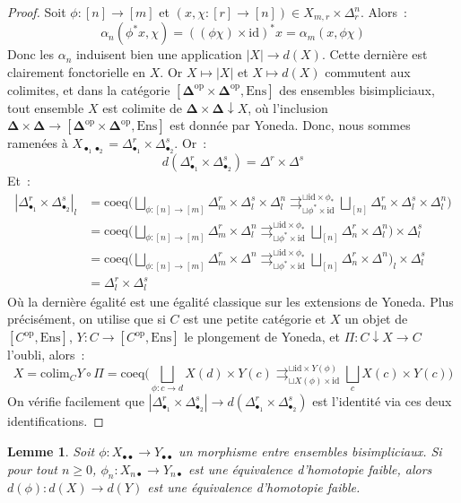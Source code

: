 \documentclass{amsart}
\theoremstyle{plain}
\newtheorem{lem}[theo]{Lemme}
\theoremstyle{definition}
\theoremstyle{remark}
\newcommand{\id}{\mathrm{id}}
\newcommand{\op}{^\mathrm{op}}
\newcommand{\Ens}{\mathrm{Ens}}
\newcommand{\DCat}{\mathbf{\Delta}}
\newcommand{\colim}{\mathrm{colim}}
\newcommand{\xlongrightrightarrows}[2]{\mathop{\rightrightarrows}_{#1}^{#2}}
\newcommand{\ra}{\rightarrow}
\begin{document}
\begin{proof}
  Soit $\phi:[n]\ra [m]$ et $(x,\chi:[r]\ra [n])\in X_{m,r}\times \Delta^n_r$. Alors~:
  $$\alpha_n(\phi^*x,\chi)=((\phi\chi)\times \id)^*x=\alpha_m(x,\phi\chi)$$
  Donc les $\alpha_n$ induisent bien une application $|X|\ra d(X)$. Cette dernière est clairement fonctorielle en $X$.
  Or $X\mapsto |X|$ et $X\mapsto d(X)$ commutent aux colimites, et dans la catégorie $[\DCat\op\times\DCat\op,\Ens]$
  des ensembles bisimpliciaux, tout ensemble $X$ est colimite de $\DCat\times\DCat\downarrow X$, où l'inclusion
  $\DCat\times\DCat\ra [\DCat\op\times\DCat\op,\Ens]$ est donnée par Yoneda.
  Donc, nous sommes ramenées à $X_{\bullet_1\bullet_2}=\Delta^r_{\bullet_1}\times\Delta^s_{\bullet_2}$. Or~:
  $$d(\Delta^r_{\bullet_1}\times\Delta^s_{\bullet_2})=\Delta^r\times\Delta^s$$
  Et~:
  \begin{align*}
    |\Delta^r_{\bullet_1}\times\Delta^s_{\bullet_2}|_l&=\mathrm{coeq}\Big(\bigsqcup_{\phi:[n]\ra [m]}\Delta^r_m\times\Delta^s_l\times\Delta^n_l
    \xlongrightrightarrows{\sqcup\phi^*\times\id}{\sqcup\id\times\phi_*}
    \bigsqcup_{[n]}\Delta^r_n\times\Delta^s_l\times\Delta^n_l\Big)\\
    &=\mathrm{coeq}\Big(\bigsqcup_{\phi:[n]\ra [m]}\Delta^r_m\times\Delta^n_l
     \xlongrightrightarrows{\sqcup\phi^*\times\id}{\sqcup\id\times\phi_*}
     \bigsqcup_{[n]}\Delta^r_n\times\Delta^n_l\Big)\times \Delta^s_l\\
     &=\mathrm{coeq}\Big(\bigsqcup_{\phi:[n]\ra [m]}\Delta_m^r\times\Delta^n
     \xlongrightrightarrows{\sqcup\phi^*\times\id}{\sqcup\id\times\phi_*}
     \bigsqcup_{[n]}\Delta_n^r\times\Delta^n\Big)_l\times \Delta^s_l\\
     &=\Delta^r_l\times \Delta^s_l
  \end{align*}
  Où la dernière égalité est une égalité classique sur les extensions de Yoneda. Plus précisément, on utilise que si $C$ est une petite
  catégorie et $X$ un objet de $[C\op,\Ens]$, $Y:C\ra [C\op,\Ens]$ le plongement de Yoneda, et $\Pi:C\downarrow X\ra C$
  l'oubli, alors~:
  $$X=\colim_C Y\circ\Pi=\mathrm{coeq}\Big(\bigsqcup_{\phi:c\ra d} X(d)\times Y(c)
  \xlongrightrightarrows{\sqcup X(\phi)\times\id}{\sqcup\id\times Y(\phi)}
  \bigsqcup_{c} X(c)\times Y(c) \Big)$$
  On vérifie facilement que $|\Delta^r_{\bullet_1}\times\Delta^s_{\bullet_2}|\ra d(\Delta^r_{\bullet_1}\times\Delta^s_{\bullet_2})$
  est l'identité via ces deux identifications.
\end{proof}

\begin{lem}\label{diagonalequiv}
  Soit $\phi:X_{\bullet\bullet}\ra Y_{\bullet\bullet}$ un morphisme entre ensembles bisimpliciaux. Si pour tout $n\geq 0$,
  $\phi_n:X_{n\bullet}\ra Y_{n\bullet}$ est une équivalence d'homotopie faible, alors $d(\phi):d(X)\ra d(Y)$ est une équivalence d'homotopie faible.
\end{lem}
\end{document}
